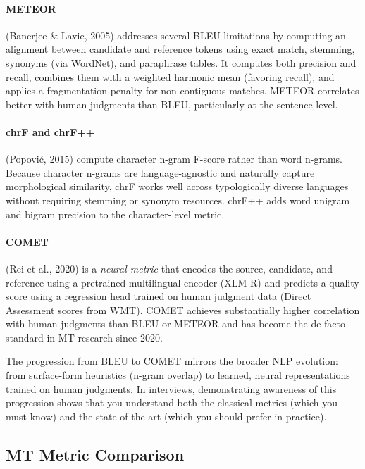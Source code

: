 \paragraph{METEOR} (Banerjee \& Lavie, 2005) addresses several BLEU limitations
by computing an alignment between candidate and reference tokens using exact
match, stemming, synonyms (via WordNet), and paraphrase tables.  It computes
both precision and recall, combines them with a weighted harmonic mean (favoring
recall), and applies a fragmentation penalty for non-contiguous matches.  METEOR
correlates better with human judgments than BLEU, particularly at the sentence
level.

\paragraph{chrF and chrF++} (Popovi\'{c}, 2015) compute character n-gram F-score
rather than word n-grams.  Because character n-grams are language-agnostic and
naturally capture morphological similarity, chrF works well across typologically
diverse languages without requiring stemming or synonym resources.  chrF++ adds
word unigram and bigram precision to the character-level metric.

\paragraph{COMET} (Rei et al., 2020) is a \emph{neural metric} that encodes the
source, candidate, and reference using a pretrained multilingual encoder (XLM-R)
and predicts a quality score using a regression head trained on human judgment
data (Direct Assessment scores from WMT).  COMET achieves substantially higher
correlation with human judgments than BLEU or METEOR and has become the de facto
standard in MT research since 2020.

\begin{keyinsight}
The progression from BLEU to COMET mirrors the broader NLP evolution: from
surface-form heuristics (n-gram overlap) to learned, neural representations
trained on human judgments.  In interviews, demonstrating awareness of this
progression shows that you understand both the classical metrics (which you must
know) and the state of the art (which you should prefer in practice).
\end{keyinsight}

\subsection{MT Metric Comparison}

